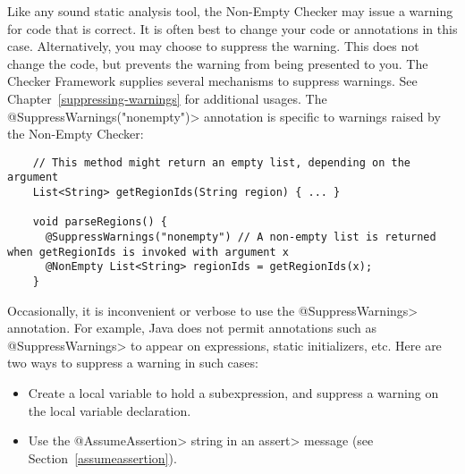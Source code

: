 
Like any sound static analysis tool, the Non-Empty Checker may issue a warning
for code that is correct.
It is often best to change your code or annotations in this case.
Alternatively, you may choose to suppress the warning.
This does not change the code, but prevents the warning from being presented to
you.
The Checker Framework supplies several mechanisms to suppress warnings.
See Chapter~\ref{suppressing-warnings} for additional usages.
The \<@SuppressWarnings("nonempty")> annotation is specific to warnings raised
by the Non-Empty Checker:

\begin{Verbatim}
    // This method might return an empty list, depending on the argument
    List<String> getRegionIds(String region) { ... }

    void parseRegions() {
      @SuppressWarnings("nonempty") // A non-empty list is returned when getRegionIds is invoked with argument x
      @NonEmpty List<String> regionIds = getRegionIds(x);
    }
\end{Verbatim}


Occasionally, it is inconvenient or verbose to use the \<@SuppressWarnings>
annotation.
For example, Java does not permit annotations such as \<@SuppressWarnings> to
appear on expressions, static initializers, etc.
Here are two ways to suppress a warning in such cases:

\begin{itemize}
\item
  Create a local variable to hold a subexpression, and
  suppress a warning on the local variable declaration.
\item
  Use the \<@AssumeAssertion> string in
  an \<assert> message (see Section~\ref{assumeassertion}).
\end{itemize}

